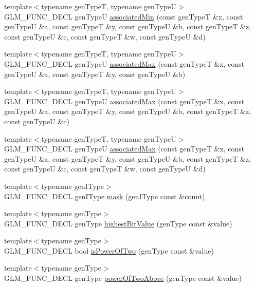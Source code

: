 \begin{CompactItemize}
\item 
{\footnotesize template$<$typename genTypeT, typename genTypeU$>$ }\\GLM\_\-FUNC\_\-DECL genTypeU \hyperlink{group__gtx__associated__min__max_g4475cafc0a4696724beef1a584f1678b}{associatedMin} (const genTypeT \&x, const genTypeU \&a, const genTypeT \&y, const genTypeU \&b, const genTypeT \&z, const genTypeU \&c, const genTypeT \&w, const genTypeU \&d)
\item 
{\footnotesize template$<$typename genTypeT, typename genTypeU$>$ }\\GLM\_\-FUNC\_\-DECL genTypeU \hyperlink{group__gtx__associated__min__max_g615648ddc725239945caf272498ae4ad}{associatedMax} (const genTypeT \&x, const genTypeU \&a, const genTypeT \&y, const genTypeU \&b)
\item 
{\footnotesize template$<$typename genTypeT, typename genTypeU$>$ }\\GLM\_\-FUNC\_\-DECL genTypeU \hyperlink{group__gtx__associated__min__max_g120284c5b592366690f3dd6a110f3605}{associatedMax} (const genTypeT \&x, const genTypeU \&a, const genTypeT \&y, const genTypeU \&b, const genTypeT \&z, const genTypeU \&c)
\item 
{\footnotesize template$<$typename genTypeT, typename genTypeU$>$ }\\GLM\_\-FUNC\_\-DECL genTypeU \hyperlink{group__gtx__associated__min__max_gf686e1b579e8518dcba6dd682e743955}{associatedMax} (const genTypeT \&x, const genTypeU \&a, const genTypeT \&y, const genTypeU \&b, const genTypeT \&z, const genTypeU \&c, const genTypeT \&w, const genTypeU \&d)
\item 
{\footnotesize template$<$typename genIType$>$ }\\GLM\_\-FUNC\_\-DECL genIType \hyperlink{group__gtx__bit_g7a909d8e8b8a5f73ed643bdca7602017}{mask} (genIType const \&count)
\item 
{\footnotesize template$<$typename genType$>$ }\\GLM\_\-FUNC\_\-DECL genType \hyperlink{group__gtx__bit_gda4310fc2dd8db30392da133067ed13e}{highestBitValue} (genType const \&value)
\item 
{\footnotesize template$<$typename genType$>$ }\\GLM\_\-FUNC\_\-DECL bool \hyperlink{group__gtx__bit_g2b12722968dabd423334391d1fd42acd}{isPowerOfTwo} (genType const \&value)
\item 
{\footnotesize template$<$typename genType$>$ }\\GLM\_\-FUNC\_\-DECL genType \hyperlink{group__gtx__bit_gf27d271ec57b96b6acae9395b9c4a365}{powerOfTwoAbove} (genType const \&value)

\end{CompactItemize}

